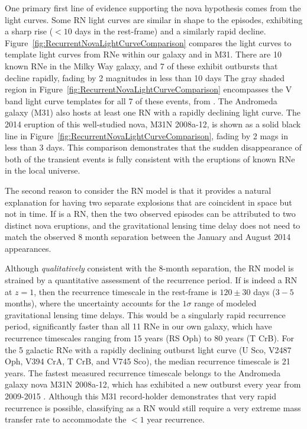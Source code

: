 One primary first line of evidence supporting the nova hypothesis
comes from the \spock light curves. Some RN light curves are similar
in shape to the \spock episodes, exhibiting a sharp rise ($<10$ days
in the rest-frame) and a similarly rapid decline.
Figure~\ref{fig:RecurrentNovaLightCurveComparison} compares the \spock
light curves to template light curves from RNe within our galaxy and
in M31.  There are 10 known RNe in the Milky Way galaxy, and 7 of
these exhibit outbursts that decline rapidly, fading by 2 magnitudes
in less than 10 days \citep{Schaefer:2010}
The gray shaded region in
Figure~\ref{fig:RecurrentNovaLightCurveComparison} encompasses the V
band light curve templates for all 7 of these events, from
\citet{Schaefer:2010}.  The Andromeda galaxy (M31) also hosts at least
one RN with a rapidly declining light curve.  The 2014 eruption of
this well-studied nova, M31N 2008a-12, is shown as a solid black line
in Figure~\ref{fig:RecurrentNovaLightCurveComparison}, fading by 2
mags in less than 3 days.  This comparison demonstrates that the
sudden disappearance of both of the \spock transient events is fully
consistent with the eruptions of known RNe in the local universe.

The second reason to consider the RN model is that it provides a
natural explanation for having two separate explosions that are
coincident in space but not in time.  If \spock is a RN, then the two
observed episodes can be attributed to two distinct nova eruptions,
and the gravitational lensing time delay does not need to match the
observed 8 month separation between the January and August 2014
appearances.

Although {\it qualitatively} consistent with the 8-month separation,
the RN model is strained by a quantitative assessment of the
recurrence period. If \spock is indeed a RN at $z=1$, then the
recurrence timescale in the rest-frame is $120\pm30$ days ($3-5$
months), where the uncertainty accounts for the $1\sigma$ range of
modeled gravitational lensing time delays.  This would be a singularly
rapid recurrence period, significantly faster than all 11 RNe in our
own galaxy, which have recurrence timescales ranging from 15 years (RS
Oph) to 80 years (T CrB). For the 5 galactic RNe with a rapidly
declining outburst light curve (U Sco, V2487 Oph, V394 CrA, T CrB, and
V745 Sco), the median recurrence timescale is 21 years.  The fastest
measured recurrence timescale belongs to the Andromeda galaxy nova
M31N 2008a-12, which has exhibited a new outburst every year from
2009-2015
\citep{Tang:2014,Darnley:2014,Darnley:2015,Henze:2015,Henze:2015a}. Although
this M31 record-holder demonstrates that very rapid recurrence is
possible, classifying \spock as a RN would still require a very
extreme mass transfer rate to accommodate the $<1$ year recurrence.

